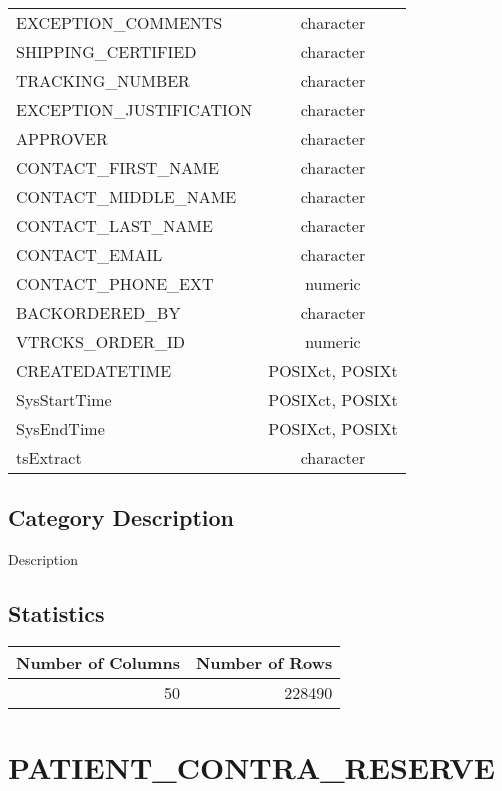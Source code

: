 \documentclass[
  letterpaper,
  DIV=11,
  numbers=noendperiod]{scrreprt}
\begin{document}
\begin{longtable}{lc}
EXCEPTION\_COMMENTS & character \\ 
SHIPPING\_CERTIFIED & character \\ 
TRACKING\_NUMBER & character \\ 
EXCEPTION\_JUSTIFICATION & character \\ 
APPROVER & character \\ 
CONTACT\_FIRST\_NAME & character \\ 
CONTACT\_MIDDLE\_NAME & character \\ 
CONTACT\_LAST\_NAME & character \\ 
CONTACT\_EMAIL & character \\ 
CONTACT\_PHONE\_EXT & numeric \\ 
BACKORDERED\_BY & character \\ 
VTRCKS\_ORDER\_ID & numeric \\ 
CREATEDATETIME & POSIXct, POSIXt \\ 
SysStartTime & POSIXct, POSIXt \\ 
SysEndTime & POSIXct, POSIXt \\ 
tsExtract & character \\ 
\bottomrule
\end{longtable}

\hypertarget{category-description-24}{%
\section*{Category Description}\label{category-description-24}}

Description

\hypertarget{statistics-24}{%
\section*{Statistics}\label{statistics-24}}

\begin{longtable}{rr}
\toprule
Number of Columns & Number of Rows \\ 
\midrule
50 & 228490 \\ 
\bottomrule
\end{longtable}

\hypertarget{patient_contra_reserve}{%
\chapter*{PATIENT\_CONTRA\_RESERVE}\label{patient_contra_reserve}}
\end{document}
